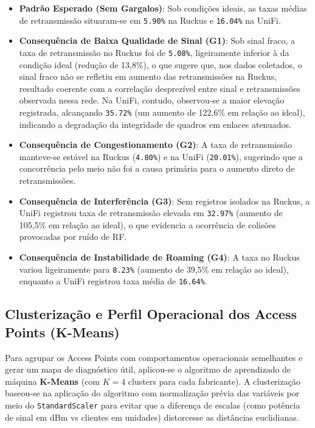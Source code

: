 \begin{itemize}
  \item \textbf{Padrão Esperado (Sem Gargalos)}: Sob condições ideais, as taxas médias de retransmissão situaram-se em \texttt{5.90\%} na Ruckus e \texttt{16.04\%} na UniFi.
  \item \textbf{Consequência de Baixa Qualidade de Sinal (G1)}: Sob sinal fraco, a taxa de retransmissão no Ruckus foi de \texttt{5.08\%}, ligeiramente inferior à da condição ideal (redução de 13,8\%), o que sugere que, nos dados coletados, o sinal fraco não se refletiu em aumento das retransmissões na Ruckus, resultado coerente com a correlação desprezível entre sinal e retransmissões observada nessa rede. Na UniFi, contudo, observou-se a maior elevação registrada, alcançando \texttt{35.72\%} (um aumento de 122,6\% em relação ao ideal), indicando a degradação da integridade de quadros em enlaces atenuados.
  \item \textbf{Consequência de Congestionamento (G2)}: A taxa de retransmissão manteve-se estável na Ruckus (\texttt{4.80\%}) e na UniFi (\texttt{20.01\%}), sugerindo que a concorrência pelo meio não foi a causa primária para o aumento direto de retransmissões.
  \item \textbf{Consequência de Interferência (G3)}: Sem registros isolados na Ruckus, a UniFi registrou taxa de retransmissão elevada em \texttt{32.97\%} (aumento de 105,5\% em relação ao ideal), o que evidencia a ocorrência de colisões provocadas por ruído de RF.
  \item \textbf{Consequência de Instabilidade de Roaming (G4)}: A taxa no Ruckus variou ligeiramente para \texttt{8.23\%} (aumento de 39,5\% em relação ao ideal), enquanto a UniFi registrou taxa média de \texttt{16.64\%}.


\end{itemize}
\subsection{Clusterização e Perfil Operacional dos Access Points (K-Means)}
\label{subsec:resultados_kmeans}

Para agrupar os Access Points com comportamentos operacionais semelhantes e gerar um mapa de diagnóstico útil, aplicou-se o algoritmo de aprendizado de máquina \textbf{K-Means} (com $K=4$ clusters para cada fabricante). A clusterização baseou-se na aplicação do algoritmo com normalização prévia das variáveis por meio do \texttt{StandardScaler} para evitar que a diferença de escalas (como potência de sinal em dBm vs clientes em unidades) distorcesse as distâncias euclidianas. 

